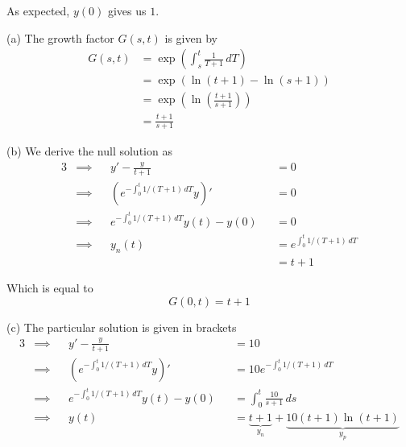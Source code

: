 \documentclass[a4paper]{article}
\begin{document}
As expected, \(y \!\left( 0 \right) \) gives us \(1\).

\vspace{12pt}


(a) The growth factor \(G \!\left( s,t \right) \) is given by
\begin{align*}
	G \!\left( s,t \right) &= \exp\left( \int^{t}_{s} \frac{1}{T + 1} \, dT \right) \\
			       & = \exp\left( \ln\left( t + 1 \right) - \ln\left( s + 1 \right) \right) \\
			       & = \exp\left( \ln\left( \frac{t + 1}{s + 1} \right) \right) \\
			       & = \frac{t + 1}{s + 1}
\end{align*}

(b) We derive the null solution as
\begin{alignat*}{3}
	&\implies && y' - \frac{y}{t + 1} && = 0 \\
	&\implies && \!\left( e^{-\int^{t}_{0} 1 / \!\left( T + 1 \right)  \, dT } y \right)' && = 0  \\ 
	&\implies && e^{-\int^{t}_{0} 1 / \!\left( T + 1 \right)  \, dT } y \!\left( t \right) - y \!\left( 0 \right) && = 0 \\
	&\implies && y_{n} \!\left( t \right) && = e^{\int^{t}_{0} 1 / \!\left( T + 1 \right)  \, dT } \\
	& && && = t + 1 
\end{alignat*}

Which is equal to
\[
	G \!\left( 0, t \right) = t + 1
\]

(c) The particular solution is given in brackets
\begin{alignat*}{3}
	&\implies && y' - \frac{y}{t + 1} && = 10 \\
	&\implies && \!\left( e^{-\int^{t}_{0} 1 / \!\left( T + 1 \right)  \, dT } y \right)' && = 10 e^{-\int^{t}_{0} 1 / \!\left( T + 1 \right)  \, dT } \\ 
	&\implies && e^{-\int^{t}_{0} 1 / \!\left( T + 1 \right)  \, dT } y \!\left( t \right) - y \!\left( 0 \right) && = \int^{t}_{0} \frac{10}{s + 1} \, ds \\
	&\implies && y \!\left( t \right) && = \underbrace{t + 1}_{y_{n}} + \underbrace{10 \!\left( t + 1 \right) \ln\left( t + 1 \right)}_{y_{p}}
\end{alignat*}
\end{document}
